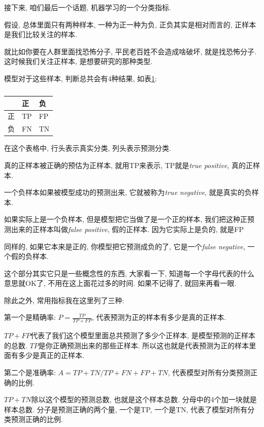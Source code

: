 接下来, 咱们最后一个话题, 机器学习的一个分类指标. 

假设, 总体里面只有两种样本, 一种为正一种为负, 正负其实是相对而言的, 正样本是我们比较关注的样本. 

就比如你要在人群里面找恐怖分子, 平民老百姓不会造成啥破坏, 就是找恐怖分子. 这时候我们关注正样本, 是想要研究的那种类型. 

模型对于这些样本, 判断总共会有4种结果, 如表\ref{tab:table23_1}: 

\begin{table}[ht]
  \centering
  \begin{tabular}{lll}
    \toprule
        & 正 & 负   \\
    \midrule
      正 & TP & FP \\
      负 & FN & TN \\
    \bottomrule
  \end{tabular}
  \caption{}
  \label{tab:table23_1}
\end{table}

在这个表格中, 行头表示真实分类, 列头表示预测分类. 

真的正样本被正确的预估为正样本, 就用TP来表示, TP就是\textit{true positive}, 真的正样本. 

一个负样本如果被模型成功的预测出来, 它就被称为\textit{true negative}, 就是真实的负样本. 

如果实际上是一个负样本, 但是模型把它当做了是一个正的样本, 我们把这种正预测出来的正样本叫做\textit{false positive}, 假的正样本. 因为它实际上是负的, 就是FP

同样的, 如果它本来是正的, 你模型把它预测成负的了, 它是一个\textit{false negative}, 一个假的负样本. 

这个部分其实它只是一些概念性的东西, 大家看一下, 知道每一个字母代表的什么意思就OK了, 不用在这上面花过多的时间. 如果不记得了, 就回来再看一眼. 

除此之外, 常用指标我在这里列了三种: 

第一个是精确率: $P = \frac{TP}{TP+FP}$, 代表预测为正的样本有多少是真的正样本. 

$TP+FP$代表了我们这个模型里面总共预测了多少个正样本, 是模型预测的正样本的总数. $TP$是你正确预测出来的那些正样本. 所以这也就是代表预测为正的样本里面有多少是真正的正样本. 

第二个是准确率: $A=TP+TN/TP+FN+FP+TN$, 代表模型对所有分类预测正确的比例. 

$TP+TN$除以这个模型的预测总数, 也就是这个样本总数. 分母中的4个加一块就是样本总数. 分子是预测正确的两个量, 一个是TP, 一个是TN, 代表了模型对所有分类预测正确的比例. 


